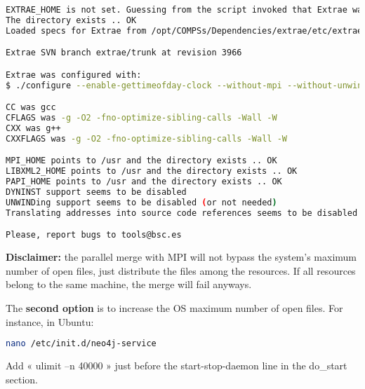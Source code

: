 \begin{lstlisting}[language=bash]
EXTRAE_HOME is not set. Guessing from the script invoked that Extrae was installed in /opt/COMPSs/Dependencies/extrae
The directory exists .. OK
Loaded specs for Extrae from /opt/COMPSs/Dependencies/extrae/etc/extrae-vars.sh

Extrae SVN branch extrae/trunk at revision 3966

Extrae was configured with:
$ ./configure --enable-gettimeofday-clock --without-mpi --without-unwind --without-dyninst --without-binutils --with-mpi=/usr --enable-parallel-merge --with-papi=/usr --with-java-jdk=/usr/lib/jvm/java-7-openjdk-amd64/ --disable-openmp --disable-nanos --disable-smpss --prefix=/opt/COMPSs/Dependencies/extrae --with-mpi=/usr --enable-parallel-merge --libdir=/opt/COMPSs/Dependencies/extrae/lib

CC was gcc
CFLAGS was -g -O2 -fno-optimize-sibling-calls -Wall -W
CXX was g++
CXXFLAGS was -g -O2 -fno-optimize-sibling-calls -Wall -W

MPI_HOME points to /usr and the directory exists .. OK
LIBXML2_HOME points to /usr and the directory exists .. OK
PAPI_HOME points to /usr and the directory exists .. OK
DYNINST support seems to be disabled
UNWINDing support seems to be disabled (or not needed)
Translating addresses into source code references seems to be disabled (or not needed)

Please, report bugs to tools@bsc.es
\end{lstlisting}

\textbf{Disclaimer:} the parallel merge with MPI will not bypass the system's maximum number of open files, just distribute the files among the resources. If all resources belong to the same machine, the merge will fail anyways.

\hfill


The \textbf{second option} is to increase the OS maximum number of open files. For instance, in Ubuntu:
\begin{lstlisting}[language=bash]
nano /etc/init.d/neo4j-service
\end{lstlisting}
Add « ulimit –n 40000 » just before the start-stop-daemon line in the do\_start section.





